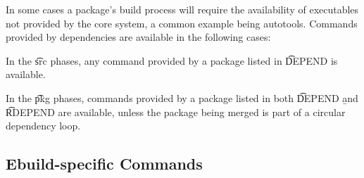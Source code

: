 In some cases a package's build process will require the availability of executables not provided by
the core system, a common example being autotools. Commands provided by dependencies are available
in the following cases:
\begin{compactitem}
\item In the \t{src} phases, any command provided by a package listed in \t{DEPEND} is available.
\item In the \t{pkg} phases, commands provided by a package listed in both \t{DEPEND} \b{and} \t{RDEPEND} are
    available, unless the package being merged is part of a circular dependency loop.
\end{compactitem}

\subsection{Ebuild-specific Commands}




